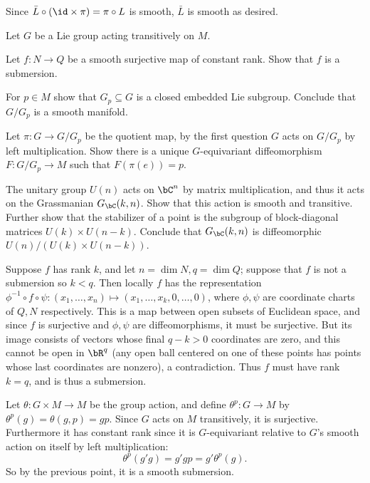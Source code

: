     Since $\bar L\circ(\id\times\pi)=\pi\circ L$ is smooth, $\bar L$ is smooth as desired.
\eenum

\bprob

    Let $G$ be a Lie group acting transitively on $M$.
    \benum
        \item Let $f\colon N\to Q$ be a smooth surjective map of constant rank.
        Show that $f$ is a submersion.
        \item For $p\in M$ show that $G_p\subseteq G$ is a closed embedded Lie subgroup.
        Conclude that $G/G_p$ is a smooth manifold.
        \item Let $\pi\colon G\to G/G_p$ be the quotient map, by the first question $G$ acts on $G/G_p$ by left multiplication.
        Show there is a unique $G$-equivariant diffeomorphism $F\colon G/G_p\to M$ such that $F(\pi(e))=p$.
        \item The unitary group $U(n)$ acts on $\bC^n$ by matrix multiplication, and thus it acts on the Grassmanian $G_\bC(k,n)$.
        Show that this action is smooth and transitive.
        Further show that the stabilizer of a point is the subgroup of block-diagonal matrices $U(k)\times U(n-k)$.
        Conclude that $G_\bC(k,n)$ is diffeomorphic $U(n)/(U(k)\times U(n-k))$.
    \eenum

\eprob

\benum
    \item Suppose $f$ has rank $k$, and let $n=\dim N,q=\dim Q$; suppose that $f$ is not a submersion so $k<q$.
    Then locally $f$ has the representation $\phi^{-1}\circ f\circ\psi\colon(x_1,\dots,x_n)\mapsto(x_1,\dots,x_k,0,\dots,0)$, where $\phi,\psi$ are coordinate charts
    of $Q,N$ respectively.
    This is a map between open subsets of Euclidean space, and since $f$ is surjective and $\phi,\psi$ are diffeomorphisms, it must be surjective.
    But its image consists of vectors whose final $q-k>0$ coordinates are zero, and this cannot be open in $\bR^q$ (any open ball centered on one of these points has points whose
    last coordinates are nonzero), a contradiction.
    Thus $f$ must have rank $k=q$, and is thus a submersion.

    \item Let $\theta\colon G\times M\to M$ be the group action, and define $\theta^p\colon G\to M$ by $\theta^p(g)=\theta(g,p)=gp$.
    Since $G$ acts on $M$ transitively, it is surjective.
    Furthermore it has constant rank since it is $G$-equivariant relative to $G$'s smooth action on itself by left multiplication:
    $$ \theta^p(g'g) = g'gp = g'\theta^p(g) . $$
    So by the previous point, it is a smooth submersion.

